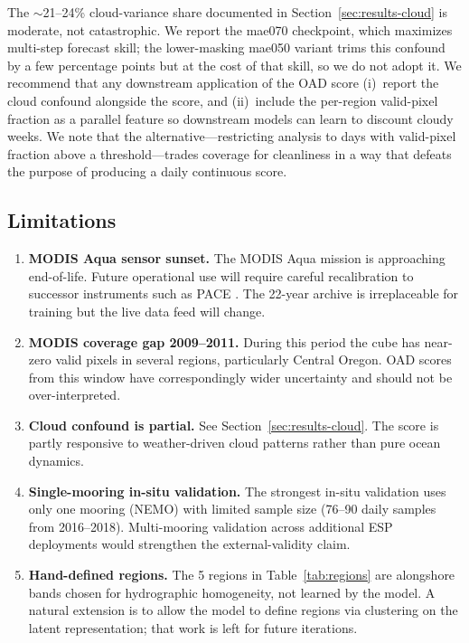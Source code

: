 \documentclass[toxins,article,submit,moreauthors]{Definitions/mdpi}
\begin{document}
The $\sim$21--24\% cloud-variance share documented in Section~\ref{sec:results-cloud} is moderate, not catastrophic. We report the mae070 checkpoint, which maximizes multi-step forecast skill; the lower-masking mae050 variant trims this confound by a few percentage points but at the cost of that skill, so we do not adopt it. We recommend that any downstream application of the OAD score (i)~report the cloud confound alongside the score, and (ii)~include the per-region valid-pixel fraction as a parallel feature so downstream models can learn to discount cloudy weeks. We note that the alternative---restricting analysis to days with valid-pixel fraction above a threshold---trades coverage for cleanliness in a way that defeats the purpose of producing a daily continuous score.

\subsection{Limitations}
\label{sec:discussion-limits}

\begin{enumerate}[nosep]
    \item \textbf{MODIS Aqua sensor sunset.} The MODIS Aqua mission is approaching end-of-life. Future operational use will require careful recalibration to successor instruments such as PACE \cite{Werdell2019}. The 22-year archive is irreplaceable for training but the live data feed will change.
    \item \textbf{MODIS coverage gap 2009--2011.} During this period the cube has near-zero valid pixels in several regions, particularly Central Oregon. OAD scores from this window have correspondingly wider uncertainty and should not be over-interpreted.
    \item \textbf{Cloud confound is partial.} See Section~\ref{sec:results-cloud}. The score is partly responsive to weather-driven cloud patterns rather than pure ocean dynamics.
    \item \textbf{Single-mooring in-situ validation.} The strongest in-situ validation uses only one mooring (NEMO) with limited sample size (76--90 daily samples from 2016--2018). Multi-mooring validation across additional ESP deployments would strengthen the external-validity claim.
    \item \textbf{Hand-defined regions.} The 5 regions in Table~\ref{tab:regions} are alongshore bands chosen for hydrographic homogeneity, not learned by the model. A natural extension is to allow the model to define regions via clustering on the latent representation; that work is left for future iterations.
\end{enumerate}
\end{document}
